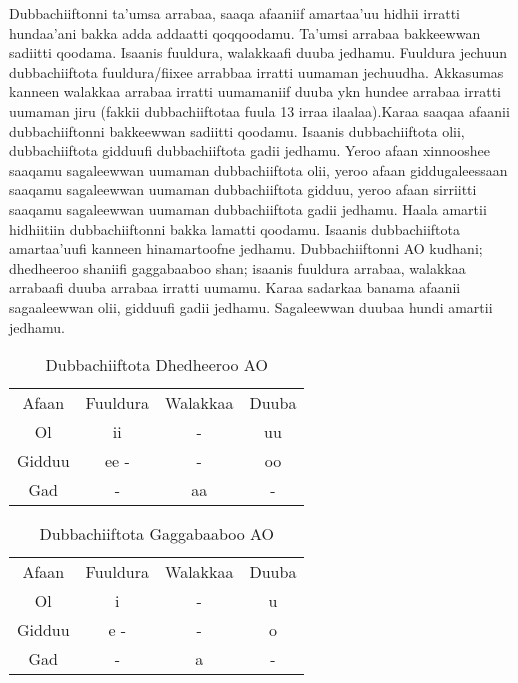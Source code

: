 \documentclass[11pt,b5paper]{book}
\begin{document}
\begin{itemize}
Dubbachiiftonni ta’umsa arrabaa, saaqa afaaniif amartaa’uu hidhii irratti hundaa’ani bakka adda addaatti qoqqoodamu.  Ta’umsi arrabaa bakkeewwan sadiitti qoodama. Isaanis  fuuldura, walakkaafi duuba jedhamu. Fuuldura jechuun  dubbachiiftota fuuldura/fiixee arrabbaa irratti uumaman  jechuudha. Akkasumas kanneen walakkaa arrabaa irratti  uumamaniif duuba ykn hundee arrabaa irratti uumaman jiru  (fakkii dubbachiiftotaa fuula 13 irraa ilaalaa).Karaa saaqaa afaanii dubbachiiftonni bakkeewwan sadiitti  qoodamu. Isaanis dubbachiiftota olii, dubbachiiftota gidduufi  dubbachiiftota gadii jedhamu. Yeroo afaan xinnooshee  saaqamu sagaleewwan uumaman dubbachiiftota olii, yeroo  afaan giddugaleessaan saaqamu sagaleewwan uumaman  dubbachiiftota gidduu, yeroo afaan sirriitti saaqamu  sagaleewwan uumaman dubbachiiftota gadii jedhamu. Haala  amartii hidhiitiin dubbachiiftonni bakka lamatti qoodamu.  Isaanis dubbachiiftota amartaa’uufi kanneen hinamartoofne  jedhamu. Dubbachiiftonni AO kudhani; dhedheeroo shaniifi gaggabaaboo  shan; isaanis fuuldura arrabaa, walakkaa arrabaafi duuba  arrabaa irratti uumamu. Karaa sadarkaa banama afaanii  sagaaleewwan olii, gidduufi gadii jedhamu. Sagaleewwan  duubaa hundi amartii jedhamu.

\begin{table}[h!]
	\centering
\caption{Dubbachiiftota Dhedheeroo AO}
\begin{tabular}{c c c c}\\
  \hline\hline
  Afaan & Fuuldura & Walakkaa & Duuba\\
  Ol & ii & - & uu\\
  Gidduu & ee - & - & oo\\
  Gad & - & aa & -\\
  \hline\hline
  \end{tabular}
\end{table}

\begin{table}[h!]
	\centering
	\caption{Dubbachiiftota Gaggabaaboo AO}	
	\begin{tabular}{c c c c} \\
		\hline\hline
		Afaan & Fuuldura & Walakkaa & Duuba\\
		Ol & i & - & u\\
		Gidduu & e - & - & o\\
		Gad & - & a & -\\
		\hline\hline
	\end{tabular}
\end{table}
  

\end{itemize}
\end{document}
